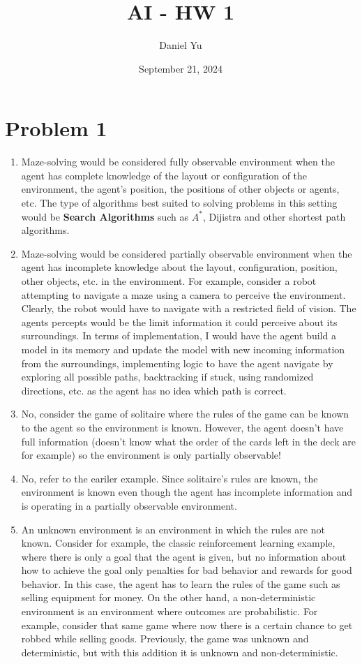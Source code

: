 \documentclass[a4paper]{article}
\title{\Huge{AI - HW 1}}
\author{\huge{Daniel Yu}}
\date{September 21, 2024}
\begin{document}
\maketitle
\newpage%
\tableofcontents
\pagebreak
\section{Problem 1}
\begin{enumerate}
  \item Maze-solving would be considered fully observable environment when the agent has complete knowledge of 
    the layout or configuration of the environment, the agent's position, the positions of other objects or 
    agents, etc. The type of algorithms best suited to solving problems in this setting would be \textbf{Search
    Algorithms} such as $A^*$, Dijistra and other shortest path algorithms.
  \item Maze-solving would be considered partially observable environment when the agent has incomplete
    knowledge about the layout, configuration, position, other objects, etc. in the environment. For example,
    consider a robot attempting to navigate a maze using a camera to perceive the environment. Clearly,
    the robot would have to navigate with a restricted field of vision. The agents percepts would be
    the limit information it could perceive about its surroundings. In terms of implementation, I 
    would have the agent build a model in its memory and update the model with new incoming information
    from the surroundings, implementing logic to have the agent navigate by exploring all possible paths,
    backtracking if stuck, using randomized directions, etc. as the agent has no idea which path is correct.
  \item No, consider the game of solitaire where the rules of the game can be known to the agent so the 
    environment is known. However, the agent doesn't have full information (doesn't know what the order of the 
    cards left in the deck are for example) so the environment is only partially observable!
  \item No, refer to the eariler example. Since solitaire's rules are known, the environment is known even
    though the agent has incomplete information and is operating in a partially observable environment.
  \item An unknown environment is an environment in which the rules are not known. Consider for example, the 
    classic reinforcement learning example, where there is only a goal that the agent is given, but no information
    about how to achieve the goal only penalties for bad behavior and rewards for good behavior. In this case,
    the agent has to learn the rules of the game such as selling equipment for money. On the other hand, 
    a non-deterministic environment is an environment where outcomes are probabilistic. For example, 
    consider that same game where now there is a certain chance to get robbed while selling goods. Previously,
    the game was unknown and deterministic, but with this addition it is unknown and non-deterministic. 
\end{enumerate}
  
\end{document}
